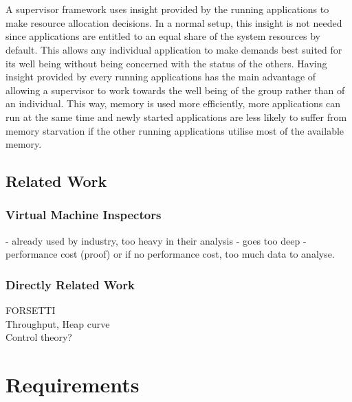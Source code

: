 \documentclass{l4proj}
\begin{document}
\\\\
\hspace*{3em} A supervisor framework uses insight provided by the running applications to make resource allocation decisions. In a normal setup, this insight is not needed since applications are entitled to an equal share of the system resources by default. This allows any individual application to make demands best suited for its well being without being concerned with the status of the others. Having insight provided by every running applications has the main advantage of allowing a supervisor to work towards the well being of the group rather than of an individual. This way, memory is used more efficiently, more applications can run at the same time and newly started applications are less likely to suffer from memory starvation if the other running applications utilise most of the available memory.
\section{Related Work}
\subsection{Virtual Machine Inspectors}
\hspace*{3em} - already used by industry, too heavy in their analysis - goes too deep - performance cost (proof) or if no performance cost, too much data to analyse.
\subsection{Directly Related Work}
FORSETTI\\
Throughput, Heap curve\\
Control theory?
\chapter{Requirements}
\end{document}
